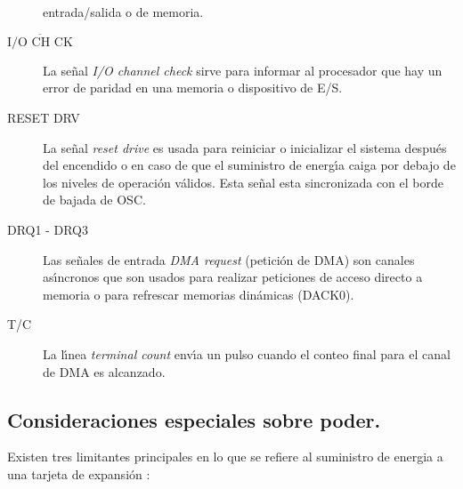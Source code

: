 \begin{description}
entrada/salida o de memoria.
\item[$\overline{\mbox{I/O CH CK}}$] La se\~nal {\it I/O channel check\/} sirve para %
informar al procesador que hay un error de paridad en una memoria o dispositivo de E/S.
\item[RESET DRV] La se\~nal {\it reset drive\/} es usada para reiniciar o inicializar el %
sistema despu\'es del encendido o en caso de que el suministro de energ\'{\i}a caiga por %
debajo de los niveles de operaci\'on v\'alidos. Esta se\~nal esta sincronizada con el borde de %
bajada de OSC.
\item[DRQ1 - DRQ3] Las se\~nales de entrada {\it DMA request} (petici\'on de DMA) son %
canales as\'{\i}ncronos que son usados para realizar peticiones de acceso directo a memoria o %
para refrescar memorias din\'amicas (DACK0).
\item[T/C] La l\'{\i}nea {\it terminal count} env\'{\i}a un pulso cuando el conteo final %
para el canal de DMA es alcanzado.
\end{description}


\subsection{Consideraciones especiales sobre poder.}
\label{Subsection:consideraciones}

Existen tres limitantes principales en lo que se refiere al suministro de energia a una tarjeta %
de expansi\'on \cite{Bus}:

